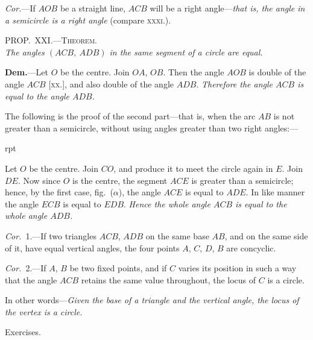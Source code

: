 \documentclass[oneside]{book}
\newcommand\myprop[2]{
\bigskip\Needspace*{4\baselineskip}\begin{center}\textsc{#1}\\\medskip\emph{#2}\par\end{center}
}
\newcommand\exhead[1]{
\Needspace*{5\baselineskip}\begin{center}
\textsf{#1}
\end{center}
}
\newcommand\imgflow[3]{
\setcounter{wrapwidth}{#1}
\begin{wrapfigure}[#2]{r}{\value{wrapwidth}pt}
\begin{center}
\vspace{-0.3in}
\end{center}
\end{wrapfigure}
}
\newcommand\imgcent[2]{
\begin{center}
\end{center}
}
\begin{document}
\emph{Cor.}---If $AOB$ be a straight line, $ACB$ will be a
right angle---\emph{that is, the angle in a semicircle is a right
angle} (compare \textsc{xxxi.}).

\myprop{PROP\@.~XXI\@.---Theorem.}{The angles $(ACB,\ ADB)$ in the same segment of a circle
are equal.}

\imgcent{235}{f127}

\textbf{Dem.}---Let $O$ be the centre. Join $OA$, $OB$. Then
the angle $AOB$ is double of the angle $ACB$ [\textsc{xx.}], and
also double of the angle $ADB$. \textit{Therefore the angle
$ACB$ is equal to the angle $ADB$.}

The following is the proof of the second part---that
is, when the arc $AB$ is not greater than a semicircle,
without using angles greater than two right angles:---

\imgflow{115}{9}{f128}

Let $O$ be the centre. Join $CO$, and produce it to meet
the circle again in $E$. Join $DE$.
Now since $O$ is the centre, the
segment $ACE$ is greater than a
semicircle; hence, by the first
case, fig.~($\alpha$), the angle $ACE$ is
equal to $ADE$. In like manner
the angle $ECB$ is equal to $EDB$.
\textit{Hence the whole angle $ACB$ is
equal to the whole angle $ADB$.}

\emph{Cor.}~1.---If two triangles $ACB$, $ADB$ on the same
base $AB$, and on the same side of it, have equal vertical
angles, the four points $A$, $C$, $D$, $B$ are concyclic\label{concylic1}.

\emph{Cor.}~2.---If $A$, $B$ be two fixed points, and if $C$ varies
its position in such a way that the angle $ACB$ retains
the same value throughout, the locus of $C$ is a circle.

In other words---\emph{Given the base of a triangle and the
vertical angle, the locus of the vertex is a circle.}

\exhead{Exercises.}
\end{document}
